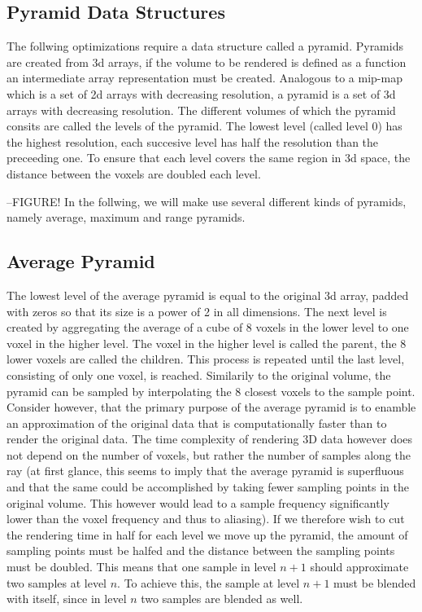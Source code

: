 \subsection{Pyramid Data Structures}
The follwing optimizations require a data structure called a pyramid. Pyramids are created from 3d arrays, if the volume to be rendered is defined as a function an intermediate array representation must be created.
Analogous to a mip-map which is a set of 2d arrays with decreasing resolution, a pyramid is a set of 3d arrays with decreasing resolution. The different volumes of which the pyramid consits are called the levels of the pyramid. The lowest level (called level 0) has the highest resolution, each succesive level has half the resolution than the preceeding one. To ensure that each level covers the same region in 3d space, the distance between the voxels are doubled each level.

--FIGURE!
In the follwing, we will make use several different kinds of pyramids, namely average, maximum and range pyramids.
\subsection{Average Pyramid}
The lowest level of the average pyramid is equal to the original 3d array, padded with zeros so that its size is a power of 2 in all dimensions.
The next level is created by aggregating the average of a cube of 8 voxels in the lower level to one voxel in the higher level. The voxel in the higher level is called the parent, the 8 lower voxels are called the children. This process is repeated until the last level, consisting of only one voxel, is reached. 
Similarily to the original volume, the pyramid can be sampled by interpolating the 8 closest voxels to the sample point. Consider however, that the primary purpose of the average pyramid is to enamble an approximation of the original data that is computationally faster than to render the original data.
The time complexity of rendering 3D data however does not depend on the number of voxels, but rather the number of samples along the ray (at first glance, this seems to imply that the average pyramid is superfluous and that the same could be accomplished by taking fewer sampling points in the original volume. This however would lead to a sample frequency significantly lower than the voxel frequency and thus to aliasing). If we therefore wish to cut the rendering time in half for each level we move up the pyramid, the amount of sampling points must be halfed and the distance between the sampling points must be doubled. This means that one sample in level $n+1$ should approximate two samples at level $n$. To achieve this, the sample at level $n+1$ must be blended with itself, since in level $n$ two samples are blended as well.


